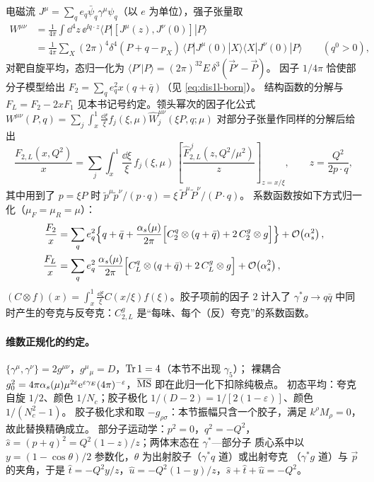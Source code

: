 电磁流 $J^\mu=\sum_q e_q\bar\psi_q\gamma^\mu\psi_q$（以 $e$ 为单位），强子张量取
\begin{align}
W^{\mu\nu}&=\frac{1}{4\pi}\int\dd^4z\,\ee^{\ii q\cdot z}\langle P|[J^\mu(z),J^\nu(0)]|P\rangle\nonumber\\
&=\frac{1}{4\pi}\sum_X(2\pi)^4\delta^4(P+q-p_X)\,\langle P|J^\mu(0)|X\rangle\langle X|J^\nu(0)|P\rangle\qquad(q^0>0),
\label{eq:dis1l-W}
\end{align}
对靶自旋平均，态归一化为 $\langle P'|P\rangle=(2\pi)^32E\,\delta^3(\vec P'-\vec P)$。
因子 $1/4\pi$ 恰使部分子模型给出 $F_2=\sum_qe_q^2x(q+\bar q)$（见 \cref{eq:dis1l-born}）。
结构函数的分解与 $F_L=F_2-2xF_1$ 见本书记号约定。领头幂次的因子化公式
$W^{\mu\nu}(P,q)=\sum_j\int_x^1\frac{\dd\xi}{\xi}f_j(\xi,\mu)\hat W_j^{\mu\nu}(\xi P,q;\mu)$
对部分子张量作同样的分解后给出
\begin{equation}\label{eq:dis1l-fact}
\frac{F_{2,L}(x,Q^2)}{x}=\sum_j\int_x^1\frac{\dd\xi}{\xi}\,f_j(\xi,\mu)\,
\left[\frac{\hat F_{2,L}^{\,j}(z,Q^2/\mu^2)}{z}\right]_{z=x/\xi},\qquad z=\frac{Q^2}{2p\cdot q},
\end{equation}
其中用到了 $p=\xi P$ 时 $\tilde p^\mu\tilde p^\nu/(p\cdot q)=\xi\,\tilde P^\mu\tilde P^\nu/(P\cdot q)$。
系数函数按如下方式归一化（$\mu_F=\mu_R=\mu$）：
\begin{align}
\frac{F_2}{x}&=\sum_q e_q^2\Big\{q+\bar q+\frac{\alpha_s(\mu)}{2\pi}\Big[C_2^q\otimes(q+\bar q)+2\,C_2^g\otimes g\Big]\Big\}+\mathcal{O}\!\left(\alpha_s^2\right),
\label{eq:dis1l-norm2}\\
\frac{F_L}{x}&=\sum_q e_q^2\,\frac{\alpha_s(\mu)}{2\pi}\Big[C_L^q\otimes(q+\bar q)+2\,C_L^g\otimes g\Big]+\mathcal{O}\!\left(\alpha_s^2\right),
\label{eq:dis1l-normL}
\end{align}
$(C\otimes f)(x)=\int_x^1\frac{\dd\xi}{\xi}C(x/\xi)f(\xi)$。胶子项前的因子 $2$ 计入了
$\gamma^*g\to q\bar q$ 中同时产生的夸克与反夸克：$C^g_{2,L}$ 是“每味、每个（反）夸克”的系数函数。

\paragraph{维数正规化的约定。}
$\{\gamma^\mu,\gamma^\nu\}=2g^{\mu\nu}$，$g^\mu{}_\mu=D$，$\operatorname{Tr} 1=4$（本节不出现 $\gamma_5$）；
裸耦合 $g_0^2=4\pi\alpha_s(\mu)\mu^{2\varepsilon}\mathrm{e}^{\varepsilon\gamma_E}(4\pi)^{-\varepsilon}$，$\overline{\mathrm{MS}}$ 即在此归一化下扣除纯极点。
初态平均：夸克自旋 $1/2$、颜色 $1/N_c$；胶子极化 $1/(D-2)=1/[2(1-\varepsilon)]$、颜色 $1/(N_c^2-1)$。
胶子极化求和取 $-g_{\rho\sigma}$：本节振幅只含一个胶子，满足 $k^\rho M_\rho=0$，故此替换精确成立。
部分子运动学：$p^2=0$，$q^2=-Q^2$，$\hat s=(p+q)^2=Q^2(1-z)/z$；两体末态在 $\gamma^*$—部分子
质心系中以 $y=(1-\cos\theta)/2$ 参数化，$\theta$ 为出射胶子（$\gamma^*q$ 道）或出射夸克
（$\gamma^*g$ 道）与 $\vec p$ 的夹角，于是 $\hat t=-Q^2y/z$，$\hat u=-Q^2(1-y)/z$，$\hat s+\hat t+\hat u=-Q^2$。

